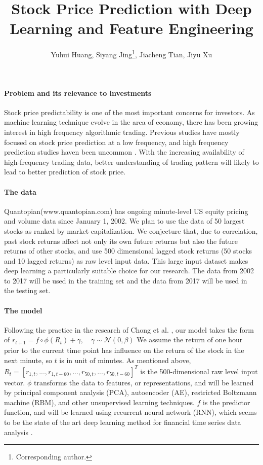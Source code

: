 \documentclass{article}
\title{Stock Price Prediction with Deep Learning and Feature Engineering}
\author{Yuhui Huang, Siyang Jing\thanks{Corresponding author.}, Jiacheng Tian, Jiyu Xu}
\begin{document}
\maketitle
\paragraph{Problem and its relevance to investments}
Stock price predictability is one of the most important concerns for investors. As machine learning technique evolve in the area of economy, there has been growing interest in high frequency algorithmic trading. Previous studies have mostly focused on stock price prediction at a low frequency, and high frequency prediction studies haven been uncommon \cite{Kearns2013}. With the increasing availability of high-frequency trading data, better understanding of trading pattern will likely to lead to better prediction of stock price.

\paragraph{The data}
Quantopian(www.quantopian.com) has ongoing minute-level US equity pricing and volume data since January 1, 2002. We plan to use the data of 50 largest stocks as ranked by market capitalization. We conjecture that, due to correlation, past stock returns affect not only its own future returns but also the future returns of other stocks, and use 500 dimensional lagged stock returns (50 stocks and 10 lagged returns) as raw level input data. This large input dataset makes deep learning a particularly suitable choice for our research. The data from 2002 to 2017 will be used in the training set and the data from 2017 will be used in the testing set.

\paragraph{The model}
Following the practice in the research of Chong et al. \cite{Chong2017}, our model takes the form of
$r_{t+1}=f\circ\phi(R_t)+\gamma,\quad\gamma\sim\mathcal{N}(0,\beta)$
We assume the return of one hour prior to the current time point has influence on the return of the stock in the next minute, so $t$ is in unit of minutes. As mentioned above, $R_t = [r_{1,t},...,r_{1,t-60},...,r_{50,t},...,r_{50,t-60}]^T$ is the 500-dimensional raw level input vector. $\phi$ transforms the data to features, or representations, and will be learned by principal component analysis (PCA), autoencoder (AE), restricted Boltzmann machine (RBM), and other unsupervised learning techniques. $f$ is the predictor function, and will be learned using recurrent neural network (RNN), which seems to be the state of the art deep learning method for financial time series data analysis \cite{Abe2018}.
\end{document}

